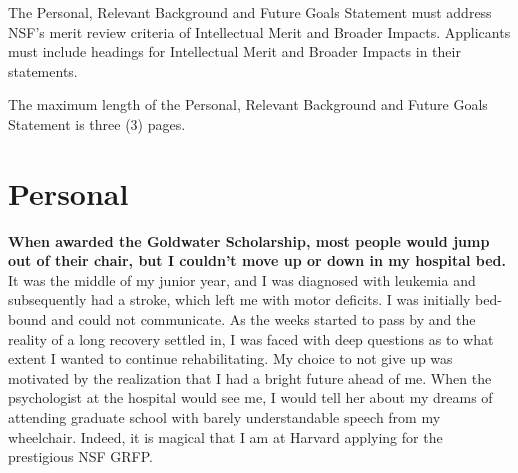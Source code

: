 \documentclass[11pt]{article} %
\begin{document}
The Personal, Relevant Background and Future Goals Statement must address NSF's merit review criteria of Intellectual Merit and Broader Impacts. Applicants must include headings for Intellectual Merit and Broader Impacts in their statements.

The maximum length of the Personal, Relevant Background and Future Goals Statement is three (3) pages.
\section{Personal}
\textbf{When awarded the Goldwater Scholarship, most people would jump out of their chair, but I couldn't move up or down in my hospital bed.} It was the middle of my junior year, and I was diagnosed with leukemia and subsequently had a stroke, which left me with motor deficits. I was initially bed-bound and could not communicate. As the weeks started to pass by and the reality of a long recovery settled in, I was faced with deep questions as to what extent I wanted to continue rehabilitating. My choice to not give up was motivated by the realization that I had a bright future ahead of me. When the psychologist at the hospital would see me, I would tell her about my dreams of attending graduate school with barely understandable speech from my wheelchair. Indeed, it is magical that I am at Harvard applying for the prestigious NSF GRFP.
\end{document}
